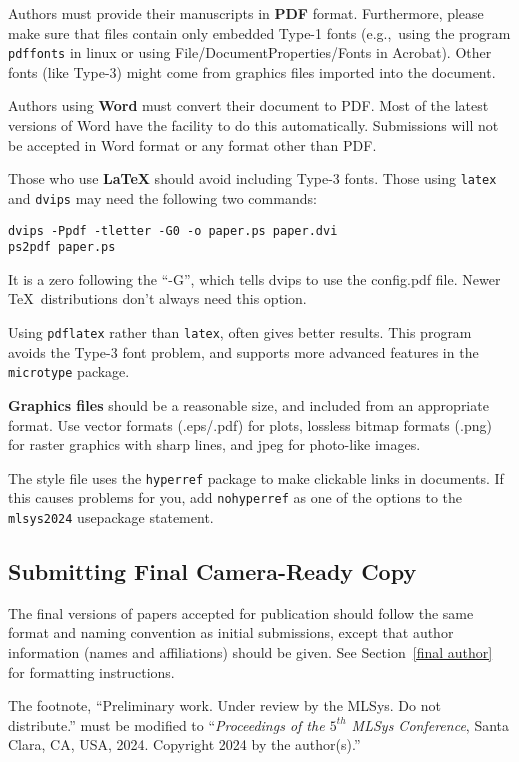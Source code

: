 \documentclass{article}
\begin{document}
\medskip

Authors must provide their manuscripts in \textbf{PDF} format.
Furthermore, please make sure that files contain only embedded Type-1 fonts
(e.g.,~using the program \texttt{pdffonts} in linux or using
File/DocumentProperties/Fonts in Acrobat). Other fonts (like Type-3)
might come from graphics files imported into the document.

Authors using \textbf{Word} must convert their document to PDF\@. Most
of the latest versions of Word have the facility to do this
automatically. Submissions will not be accepted in Word format or any
format other than PDF\@.

Those who use \textbf{\LaTeX} should avoid including Type-3 fonts.
Those using \texttt{latex} and \texttt{dvips} may need the following
two commands:

{\footnotesize
\begin{verbatim}
dvips -Ppdf -tletter -G0 -o paper.ps paper.dvi
ps2pdf paper.ps
\end{verbatim}}
It is a zero following the ``-G'', which tells dvips to use
the config.pdf file. Newer \TeX\ distributions don't always need this
option.

Using \texttt{pdflatex} rather than \texttt{latex}, often gives better
results. This program avoids the Type-3 font problem, and supports more
advanced features in the \texttt{microtype} package.

\textbf{Graphics files} should be a reasonable size, and included from
an appropriate format. Use vector formats (.eps/.pdf) for plots,
lossless bitmap formats (.png) for raster graphics with sharp lines, and
jpeg for photo-like images.

The style file uses the \texttt{hyperref} package to make clickable
links in documents. If this causes problems for you, add
\texttt{nohyperref} as one of the options to the \texttt{mlsys2024}
usepackage statement.


\subsection{Submitting Final Camera-Ready Copy}

The final versions of papers accepted for publication should follow the
same format and naming convention as initial submissions, except that
author information (names and affiliations) should be given. See
Section~\ref{final author} for formatting instructions.

The footnote, ``Preliminary work. Under review by the MLSys. Do not distribute.''
must be modified to ``\textit{Proceedings of the
$\mathit{5}^{th}$ MLSys Conference},
Santa Clara, CA, USA, 2024.
Copyright 2024 by the author(s).''
\end{document}
